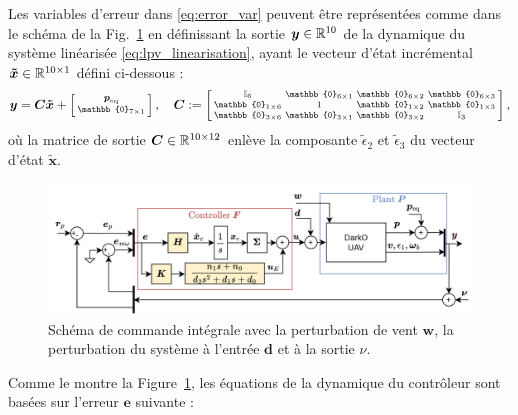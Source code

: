 Les variables d'erreur dans \eqref{eq:error_var} peuvent être représentées comme dans le schéma  de la Fig.~\ref{fig:commande_int6DOF} en définissant la sortie $\boldsymbol{y}\in {\mathbb R}^{10}$ de la dynamique du système linéarisée \eqref{eq:lpv_linearisation}, ayant le vecteur d'état incrémental $\boldsymbol{\tilde{x}} \in {\mathbb R}^{10 \times 1}$ défini ci-dessous : 
\begin{align}
    \label{eq:output_lin}
    \boldsymbol{y} = \boldsymbol{C} \boldsymbol{\tilde{x}} + \smallmat{\boldsymbol{p}_{\mathrm{eq}} \\ \mathbb{0}_{7 \times 1}}, \quad
 \boldsymbol{C} := \smallmat{\mathbb{I}_{6} & \mathbb{0}_{6\times 1} & \mathbb{0}_{6\times 2} &\mathbb{0}_{6\times 3}\\
    \mathbb{0}_{1\times 6} & 1 & \mathbb{0}_{1\times 2} &\mathbb{0}_{1\times 3}\\
    \mathbb{0}_{3\times 6} & \mathbb{0}_{3\times 1} & \mathbb{0}_{3\times 2} &  \mathbb{I}_{3}
},
\end{align}
où la matrice de sortie $\boldsymbol{C} \in {\mathbb R}^{10\times12}$ enlève la composante $\tilde{\epsilon}_{2}$ et $\tilde{\epsilon}_{3}$ du vecteur d'état $\tilde{\boldsymbol{x}}$. 

\begin{figure}[t!]
    \centering
    \includegraphics[width=0.8\columnwidth]{figures/commande_integrale.png}
    \caption{Schéma de commande intégrale avec la perturbation de vent $\boldsymbol{w}$, la perturbation du système à l'entrée $\boldsymbol{d}$ et à la sortie $\nu$.}
    \label{fig:commande_int6DOF}
\end{figure}

Comme le montre la Figure~\ref{fig:commande_int6DOF}, les équations de la dynamique du contrôleur sont basées sur l'erreur $\boldsymbol{e}$ suivante :

